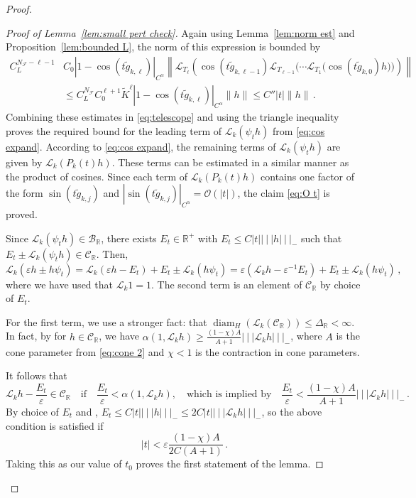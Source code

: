 \documentclass{amsart}
\numberwithin{equation}{section}
\newcommand\cB{{\mathcal B}}
\newcommand\cC{{\mathcal C}}
\newcommand\cF{{\mathcal F}}
\newcommand\cL{{\mathcal L}}
\newcommand\bR{{\mathbb R}}
\newcommand\ve{\varepsilon}
\newcommand{\tri}{{|\:\!\!|\:\!\!|}}
\newcommand{\diam}{\operatorname{diam}}
\begin{document}
\begin{proof}
\begin{proof}[Proof of Lemma~\ref{lem:small pert check}]
Again using Lemma~\ref{lem:norm est} and Proposition~\eqref{lem:bounded L}, the norm of this expression is bounded by
\[
\begin{split}
C_L^{N_\cF - \ell -1} & C_0 | 1 - \cos (t\tilde g_{k,\ell}) |_{C^\alpha} \left\| \cL_{T_\ell} \left (\cos (t \tilde g_{k,\ell-1}) \cL_{T_{\ell -1} } \big(  \cdots  \cL_{T_1} \big( \cos ( t \tilde g_{k,0}) h \big) \big) \right) \right\| \\
& \le C_L^{N_\cF} C_0^{\ell+1} \tilde K^\ell  | 1 - \cos (t\tilde g_{k,\ell}) |_{C^\alpha} \| h\|
\le C'' |t| \| h\| \, .
\end{split}
\]
Combining these estimates in \eqref{eq:telescope} and using the triangle inequality proves the required bound
for the leading term of $\cL_k(\psi_t h)$ from \eqref{eq:cos expand}.  According to \eqref{eq:cos expand},
the remaining terms of $\cL_k(\psi_t h)$ are given by $\cL_k( P_k(t) h)$.  These terms can be estimated 
in a similar manner as the product of cosines.  
Since each term of $\cL_k( P_k(t) h)$ contains one factor of the form
$\sin (t \tilde g_{k,j})$ and $| \sin(t \tilde g_{k,j})|_{C^\alpha} = \mathcal{O}(|t|)$, the claim \eqref{eq:O t} is proved.


Since 
$\cL_k(\psi_t h) \in \cB_{\bR}$, there exists $E_t \in \bR^+$ with 
$E_t \le C |t| \tri h \tri_-$ such that
$E_t \pm \cL_k(\psi_t h) \in \cC_{\bR}$.  Then,
\[
\cL_k (\ve h \pm h \psi_t) = \cL_k (\ve h - E_t) + E_t \pm \cL_k (h \psi_t)
= \ve (\cL_k h - \ve^{-1} E_t) + E_t \pm \cL_k (h \psi_t) \, ,
\]
where we have used that $\cL_k 1 =1$.  The second term is an element of $\cC_{\bR}$ by choice of $E_t$.

For the first term, we use a stronger fact: that $\diam_H( \cL_k(\cC_{\bR})) \le \Delta_{\bR} < \infty$.  
In fact, by \cite[Prop. 6.13]{DL22} for $h \in \cC_{\bR}$, we have
$\alpha(1, \cL_k h ) \ge \frac{(1-\chi) A}{A+1} \tri \cL_k h \tri_-$, where $A$ is the cone parameter from \eqref{eq:cone 2}
and $\chi <1$ is the contraction
in cone parameters.

It follows that
\[
\cL_k h - \frac{E_t}{\ve} \in \cC_{\bR} \quad \mbox{if} \quad \frac{E_t}{\ve} < \alpha(1, \cL_k h) , \quad
\mbox{which is implied by} \quad \frac{E_t}{\ve} < \frac{(1-\chi) A}{A+1} \tri \cL_k h \tri_- \, .
\]
By choice of $E_t$ and \cite[Lemma 5.4]{DL22}, $E_t \le C |t| \tri h \tri_- \le 2 C |t| \tri \cL_k h \tri_-$,
so the above condition is satisfied if
\[
|t| < \ve \frac{(1-\chi) A}{2 C (A+1)} \, .
\]
Taking this as our value of $t_0$ proves the first statement of the lemma.


\end{proof}
\end{proof}
\end{document}
